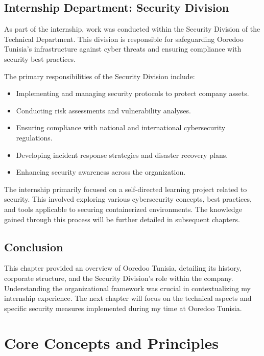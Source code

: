\documentclass[12pt,a4paper]{report}
\begin{document}
\section{Internship Department: Security Division}
As part of the internship, work was conducted within the Security Division of the Technical Department. This division is responsible for safeguarding Ooredoo Tunisia's infrastructure against cyber threats and ensuring compliance with security best practices.

The primary responsibilities of the Security Division include:
\begin{itemize}
\item Implementing and managing security protocols to protect company assets.
\item Conducting risk assessments and vulnerability analyses.
\item Ensuring compliance with national and international cybersecurity regulations.
\item Developing incident response strategies and disaster recovery plans.
\item Enhancing security awareness across the organization.
\end{itemize}

The internship primarily focused on a self-directed learning project related to security. This involved exploring various cybersecurity concepts, best practices, and tools applicable to securing containerized environments. The knowledge gained through this process will be further detailed in subsequent chapters.

\section{Conclusion}
This chapter provided an overview of Ooredoo Tunisia, detailing its history, corporate structure, and the Security Division’s role within the company. Understanding the organizational framework was crucial in contextualizing my internship experience. The next chapter will focus on the technical aspects and specific security measures implemented during my time at Ooredoo Tunisia.





\newpage
\chapter{Core Concepts and Principles}
\end{document}
